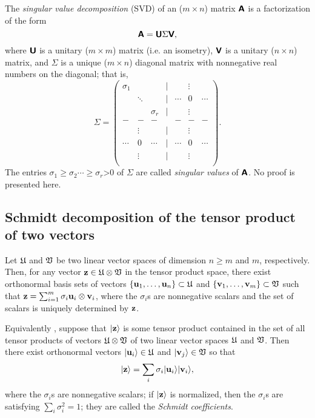 The {\em singular value decomposition}
(SVD)
of an ($m\times n$)  matrix $\textsf{\textbf{A}}$ is a factorization of the form
\begin{equation}
\textsf{\textbf{A}} = \textsf{\textbf{U}} \Sigma \textsf{\textbf{V}} ,
\end{equation}
where
$\textsf{\textbf{U}}$ is a unitary ($m\times m$)  matrix (i.e. an isometry),
$\textsf{\textbf{V}}$ is a unitary ($n\times n$)  matrix,
and
$\Sigma$ is a unique ($m\times n$)   diagonal matrix with nonnegative real numbers on the diagonal;
that is,
\begin{equation}
\Sigma =
\begin{pmatrix}
\sigma_1&&&{|}&&\vdots& \\
  &\ddots &&{|}&\cdots &0&\cdots \\
&&\sigma_r&{|}&&\vdots& \\
-&-&-&&-&-&- \\
&\vdots&&{|}&&\vdots& \\
\cdots &0&\cdots &{|}&\cdots &0&\cdots \\
&\vdots&&{|}&&\vdots& \\
\end{pmatrix}.
\end{equation}
The entries $\sigma_1\ge \sigma_2 \cdots \ge \sigma_r$>0 of $\Sigma$ are called {\em singular values}
of $\textsf{\textbf{A}}$.  No proof is presented here.

\subsection{Schmidt decomposition of the tensor product of two vectors}
\label{2011-m-Schmidtdecomposition}

Let  ${\frak U}$  and   ${\frak V}$ be
two linear vector spaces
of dimension $n\ge m$ and $m$, respectively.
Then, for any vector
${\bf z} \in {\frak U}\otimes {\frak V}$
in the tensor product space,
there exist
orthonormal basis sets of vectors
$\{ {\bf u}_1, \ldots ,{\bf u}_n \}  \subset  {\frak U}$
and
$\{ {\bf v}_1, \ldots ,{\bf v}_m \}  \subset  {\frak V}$
such that
${\bf z}=\sum_{i=1}^m
\sigma_i  {\bf u}_i \otimes  {\bf v}_i$,
where the $\sigma_i$s are nonnegative scalars and the set of scalars is uniquely determined by
${\bf z}$.

Equivalently \cite{nielsen-book}, suppose that
$\vert {\bf z}\rangle $
 is some tensor product  contained in   the set of all tensor products of vectors
$ {\frak U}\otimes {\frak V}$ of     two linear vector spaces
 ${\frak U}$  and   ${\frak V}$.
Then there exist orthonormal vectors
$ \vert {\bf u}_i  \rangle \in  {\frak U}$
and
$ \vert {\bf v}_j  \rangle \in  {\frak V}$
so that
\begin{equation}
  \vert {\bf z}\rangle = \sum_i \sigma_i   \vert {\bf u}_i  \rangle  \vert {\bf v}_i  \rangle ,
\label{2011-e-sd}
\end{equation}
where the  $\sigma_i$s are nonnegative scalars; if $  \vert {\bf z}\rangle$
is normalized, then the  $\sigma_i$s are  satisfying
$\sum_i \sigma_i^2=1$;
they are called the
{\em Schmidt coefficients}.

